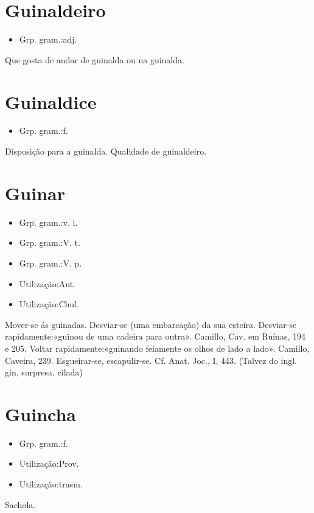 \section{Guinaldeiro}
\begin{itemize}
\item {Grp. gram.:adj.}
\end{itemize}
Que gosta de andar de guinalda ou na guinalda.
\section{Guinaldice}
\begin{itemize}
\item {Grp. gram.:f.}
\end{itemize}
Disposição para a guinalda.
Qualidade de guinaldeiro.
\section{Guinar}
\begin{itemize}
\item {Grp. gram.:v. i.}
\end{itemize}
\begin{itemize}
\item {Grp. gram.:V. t.}
\end{itemize}
\begin{itemize}
\item {Grp. gram.:V. p.}
\end{itemize}
\begin{itemize}
\item {Utilização:Ant.}
\end{itemize}
\begin{itemize}
\item {Utilização:Chul.}
\end{itemize}
Mover-se ás guinadas.
Desviar-se (uma embarcação) da sua esteira.
Desviar-se rapidamente:«\textunderscore guinou de uma cadeira para outra\textunderscore ». Camillo, \textunderscore Cav. em Ruínas\textunderscore , 194 e 205.
Voltar rapidamente:«\textunderscore guinando feiamente os olhos de lado a lado\textunderscore ». Camillo, \textunderscore Caveira\textunderscore , 239.
Esgueirar-se, escapulir-se. Cf. \textunderscore Anat. Joc.\textunderscore , I, 443.
(Talvez do ingl. \textunderscore gin\textunderscore , surpresa, cilada)
\section{Guincha}
\begin{itemize}
\item {Grp. gram.:f.}
\end{itemize}
\begin{itemize}
\item {Utilização:Prov.}
\end{itemize}
\begin{itemize}
\item {Utilização:trasm.}
\end{itemize}
Sachola.
